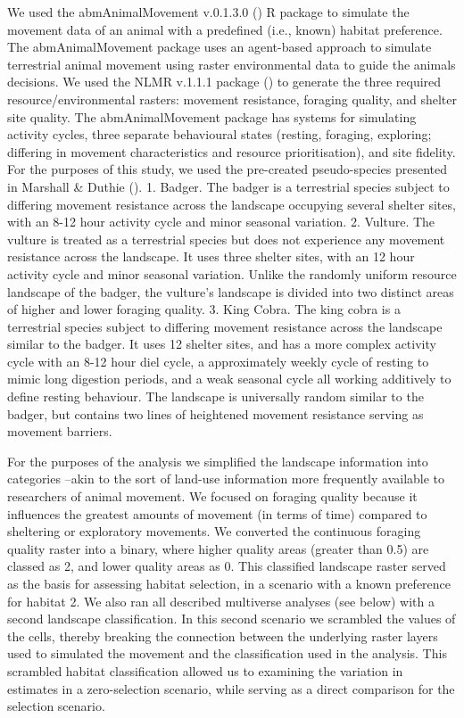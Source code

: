 \documentclass[10pt,a4paper]{article}
\begin{document}
We used the abmAnimalMovement v.0.1.3.0 () R package to simulate the movement data of an animal with a predefined (i.e., known) habitat preference.
The abmAnimalMovement package uses an agent-based approach to simulate terrestrial animal movement using raster environmental data to guide the animals decisions.
We used the NLMR v.1.1.1 package () to generate the three required resource/environmental rasters: movement resistance, foraging quality, and shelter site quality.
The abmAnimalMovement package has systems for simulating activity cycles, three separate behavioural states (resting, foraging, exploring; differing in movement characteristics and resource prioritisation), and site fidelity.
For the purposes of this study, we used the pre-created pseudo-species presented in Marshall \& Duthie ().
1. Badger. The badger is a terrestrial species subject to differing movement resistance across the landscape occupying several shelter sites, with an 8-12 hour activity cycle and minor seasonal variation.
2. Vulture. The vulture is treated as a terrestrial species but does not experience any movement resistance across the landscape. It uses three shelter sites, with an 12 hour activity cycle and minor seasonal variation. Unlike the randomly uniform resource landscape of the badger, the vulture's landscape is divided into two distinct areas of higher and lower foraging quality.
3. King Cobra. The king cobra is a terrestrial species subject to differing movement resistance across the landscape similar to the badger. It uses 12 shelter sites, and has a more complex activity cycle with an 8-12 hour diel cycle, a approximately weekly cycle of resting to mimic long digestion periods, and a weak seasonal cycle all working additively to define resting behaviour. The landscape is universally random similar to the badger, but contains two lines of heightened movement resistance serving as movement barriers.

For the purposes of the analysis we simplified the landscape information into categories --akin to the sort of land-use information more frequently available to researchers of animal movement.
We focused on foraging quality because it influences the greatest amounts of movement (in terms of time) compared to sheltering or exploratory movements.
We converted the continuous foraging quality raster into a binary, where higher quality areas (greater than 0.5) are classed as 2, and lower quality areas as 0.
This classified landscape raster served as the basis for assessing habitat selection, in a scenario with a known preference for habitat 2.
We also ran all described multiverse analyses (see below) with a second landscape classification.
In this second scenario we scrambled the values of the cells, thereby breaking the connection between the underlying raster layers used to simulated the movement and the classification used in the analysis.
This scrambled habitat classification allowed us to examining the variation in estimates in a zero-selection scenario, while serving as a direct comparison for the selection scenario.
\end{document}
